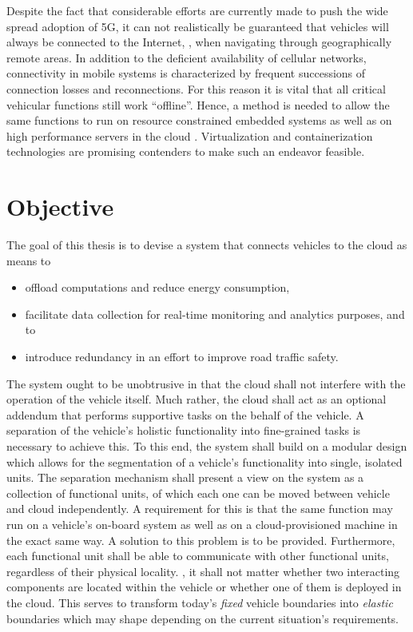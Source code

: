 Despite the fact that considerable efforts are currently made to push the wide spread adoption of 5G, it can not realistically be guaranteed that vehicles will always be connected to the Internet, \eg , when navigating through geographically remote areas. In addition to the deficient availability of cellular networks, connectivity in mobile systems is characterized by frequent successions of connection losses and reconnections. For this reason it is vital that all critical vehicular functions still work ``offline''. Hence, a method is needed to allow the same functions to run on resource constrained embedded systems as well as on high performance servers in the cloud \cite{white2010r}. Virtualization and containerization technologies are promising contenders to make such an endeavor feasible.

%
%
%
%
%
%
%
%
%
%

\section{Objective}
The goal of this thesis is to devise a system that connects vehicles to the cloud as means to
\begin{itemize}
\item offload computations and reduce energy consumption,
\item facilitate data collection for real-time monitoring and analytics purposes, and to
\item introduce redundancy in an effort to improve road traffic safety.
\end{itemize}
The system ought to be unobtrusive in that the cloud shall not interfere with the operation of the vehicle itself. Much rather, the cloud shall act as an optional addendum that performs supportive tasks on the behalf of the vehicle. A separation of the vehicle's holistic functionality into fine-grained tasks is necessary to achieve this. To this end, the system shall build on a modular design which allows for the segmentation of a vehicle's functionality into single, isolated units. The separation mechanism shall present a view on the system as a collection of functional units, of which each one can be moved between vehicle and cloud independently. A requirement for this is that the same function may run on a vehicle's on-board system as well as on a cloud-provisioned machine in the exact same way. A solution to this problem is to be provided. Furthermore, each functional unit shall be able to communicate with other functional units, regardless of their physical locality. \Ie , it shall not matter whether two interacting components are located within the vehicle or whether one of them is deployed in the cloud. This serves to transform today's \emph{fixed} vehicle boundaries into \emph{elastic} boundaries which may shape depending on the current situation's requirements.

